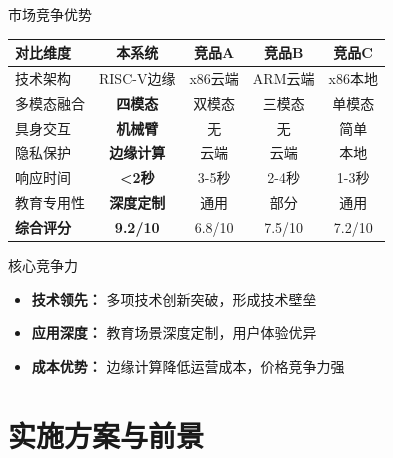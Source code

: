 \documentclass[aspectratio=169,12pt]{beamer}
\newcommand{\highlight}[1]{\textcolor{primaryblue}{\textbf{#1}}}
\newcommand{\success}[1]{\textcolor{successgreen}{\textbf{#1}}}
\begin{document}
\begin{frame}{市场竞争优势}
    \begin{table}[h]
        \centering
        \footnotesize
        \begin{tabular}{|l|c|c|c|c|}
        \hline
        \textbf{对比维度} & \textbf{本系统} & \textbf{竞品A} & \textbf{竞品B} & \textbf{竞品C} \\
        \hline
        技术架构 & RISC-V边缘 & x86云端 & ARM云端 & x86本地 \\
        \hline
        多模态融合 & \success{四模态} & 双模态 & 三模态 & 单模态 \\
        \hline
        具身交互 & \success{机械臂} & 无 & 无 & 简单 \\
        \hline
        隐私保护 & \success{边缘计算} & 云端 & 云端 & 本地 \\
        \hline
        响应时间 & \success{<2秒} & 3-5秒 & 2-4秒 & 1-3秒 \\
        \hline
        教育专用性 & \success{深度定制} & 通用 & 部分 & 通用 \\
        \hline
        \textbf{综合评分} & \success{\textbf{9.2/10}} & 6.8/10 & 7.5/10 & 7.2/10 \\
        \hline
        \end{tabular}
    \end{table}
    
    \begin{alertblock}{核心竞争力}
        \begin{itemize}
            \item \highlight{技术领先：} 多项技术创新突破，形成技术壁垒
            \item \highlight{应用深度：} 教育场景深度定制，用户体验优异  
            \item \highlight{成本优势：} 边缘计算降低运营成本，价格竞争力强
        \end{itemize}
    \end{alertblock}
\end{frame}

\section{实施方案与前景}
\end{document}

